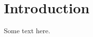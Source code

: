 \documentclass[../../main/main.tex]{subfiles}
\begin{document}
\chapter{Introduction}
Some text here.\cite{ChinOlder}
\end{document}
